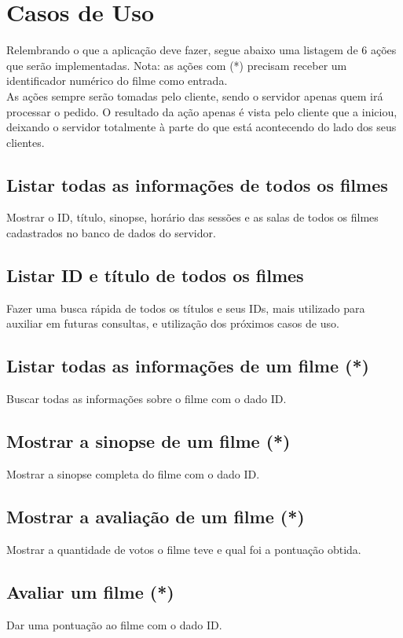 \documentclass[11pt,twoside]{article}
\begin{document}
\section{Casos de Uso}

Relembrando o que a aplicação deve fazer, segue abaixo uma listagem de 6 ações que serão implementadas. Nota: as ações com (*) precisam receber um identificador numérico do filme como entrada.\\
As ações sempre serão tomadas pelo cliente, sendo o servidor apenas quem irá processar o pedido. O resultado da ação apenas é vista pelo cliente que a iniciou, deixando o servidor totalmente à parte do que está acontecendo do lado dos seus clientes.
\subsection{Listar todas as informações de todos os filmes}
Mostrar o ID, título, sinopse, horário das sessões e as salas de todos os filmes cadastrados no banco de dados do servidor.
\subsection{Listar ID e título de todos os filmes}
Fazer uma busca rápida de todos os títulos e seus IDs, mais utilizado para auxiliar em futuras consultas, e utilização dos próximos casos de uso.
\subsection{Listar todas as informações de um filme (*)}
Buscar todas as informações sobre o filme com o dado ID.
\subsection{Mostrar a sinopse de um filme (*)}
Mostrar a sinopse completa do filme com o dado ID.
\subsection{Mostrar a avaliação de um filme (*)}
Mostrar a quantidade de votos o filme teve e qual foi a pontuação obtida.
\subsection{Avaliar um filme (*)}
Dar uma pontuação ao filme com o dado ID.
\end{document}
